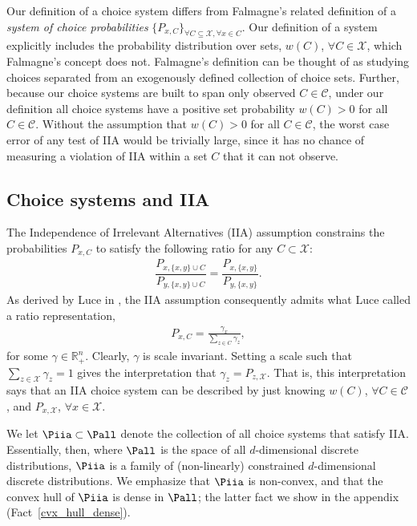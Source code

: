 \documentclass[10pt]{article}
\begin{document}
\begin{ReviewVerbatim}
	Our definition of a choice system differs from Falmagne's \cite{falmagne1978representation,barbera1986falmagne} related definition of a {\it system of choice probabilities} $\{P_{x,C}\}_{\forall C \subseteq \mathcal X, \forall x \in C}$. Our definition of a system explicitly includes the probability distribution over sets, $w(C)$, $\forall C \in \mathcal X$, which Falmagne's concept does not. Falmagne's definition can be thought of as studying choices separated from an exogenously defined collection of choice sets. Further, because our choice systems are built to span only observed $C \in \mathcal{C}$, under our definition all choice systems have a positive set probability $w(C)>0$ for all $C \in \mathcal{C}$. Without the assumption that $w(C)>0$ for all $C \in \mathcal{C}$, the worst case error of any test of IIA would be trivially large, since it has no chance of measuring a violation of IIA within a set $C$ that it can not observe.

	\subsection{Choice systems and IIA}
	The Independence of Irrelevant Alternatives (IIA) assumption constrains the probabilities $P_{x,C}$ to satisfy the following ratio for any $C \subset \mathcal{X}$:
	\begin{align*}
	\dfrac{P_{x,\lbrace x, y \rbrace \cup C}}{P_{y,\lbrace x, y \rbrace \cup C}} = \dfrac{P_{x,\lbrace x, y \rbrace}}{P_{y,\lbrace x, y \rbrace}}.
	\end{align*}
	As derived by Luce in \cite{luce1959individual}, the IIA assumption consequently admits what Luce called a ratio representation,
	\begin{align*}
	P_{x,C} = \frac{\gamma_x}{\sum_{z \in C} \gamma_z},
	\end{align*}
	for some $\gamma \in \mathbb{R}_+^n$. Clearly, $\gamma$ is scale invariant. Setting a scale such that $\sum_{z \in \mathcal{X}} \gamma_z = 1$ gives the interpretation that $\gamma_z = P_{z, \mathcal{X}}$.
	That is, this interpretation says that an IIA choice system can be described by just knowing $w(C)$, $\forall  C \in \mathcal{C}$, and $P_{x,\mathcal{X}}$, $\forall x \in \mathcal X$.

	We let $\Piia \subset \Pall$ denote the collection of all choice systems that satisfy IIA. Essentially, then, where $\Pall$ is the space of all $d$-dimensional discrete distributions, $\Piia$ is a family of (non-linearly) constrained $d$-dimensional discrete distributions. We emphasize that $\Piia$ is non-convex, and that the convex hull of $\Piia$ is dense in $\Pall$; the latter fact we show in the appendix (Fact~\ref{cvx_hull_dense}).
\end{ReviewVerbatim}
\end{document}

